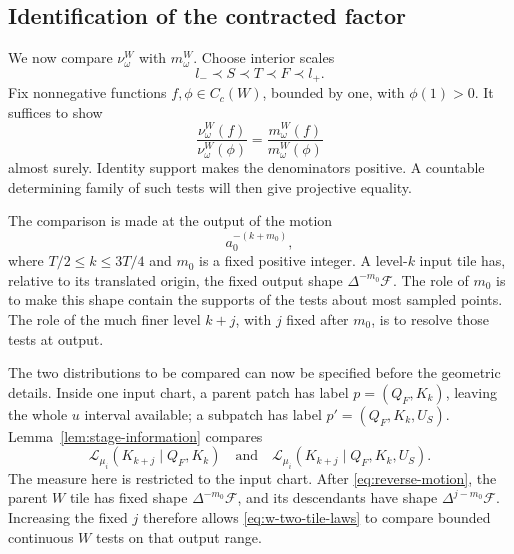 \subsection{Identification of the contracted factor}

We now compare \(\nu^W_\omega\) with \(m^W_\omega\).  Choose
interior scales
\begin{equation}\label{eq:w-factor-scales}
                       l_-\prec S\prec T\prec F\prec l_+.
\end{equation}
Fix nonnegative functions \(f,\phi\in C_c(W)\), bounded by one,
with \(\phi(1)>0\).  It suffices to show
\begin{equation}\label{eq:w-ratio-target}
        \frac{\nu^W_\omega(f)}{\nu^W_\omega(\phi)}
                  =
        \frac{m^W_\omega(f)}{m^W_\omega(\phi)}
\end{equation}
almost surely.  Identity support makes the denominators positive.
A countable determining family of such tests will then give
projective equality.

The comparison is made at the output of the motion
\begin{equation}\label{eq:reverse-motion}
                         a_0^{-(k+m_0)},
\end{equation}
where \(T/2\le k\le3T/4\) and \(m_0\) is a fixed positive integer.
A level-\(k\) input tile has, relative to its translated origin,
the fixed output shape \(\Delta^{-m_0}\mathcal F\).
The role of \(m_0\) is to make this shape contain the supports of
the tests about most sampled points.  The role of the much finer
level \(k+j\), with \(j\) fixed after \(m_0\), is to resolve those
tests at output.

The two distributions to be compared can now be specified before
the geometric details.  Inside one input chart, a parent patch has
label \(p=(Q_F,K_k)\), leaving the whole \(u\) interval available;
a subpatch has label \(p'=(Q_F,K_k,U_S)\).
Lemma~\ref{lem:stage-information} compares
\begin{equation}\label{eq:w-two-tile-laws}
 \mathcal L_{\mu_i}(K_{k+j}\mid Q_F,K_k)
 \quad\text{and}\quad
 \mathcal L_{\mu_i}(K_{k+j}\mid Q_F,K_k,U_S).
\end{equation}
The measure here is restricted to the input chart.
After \eqref{eq:reverse-motion}, the parent \(W\) tile has fixed
shape \(\Delta^{-m_0}\mathcal F\), and its descendants have shape
\(\Delta^{j-m_0}\mathcal F\).  Increasing the fixed \(j\) therefore
allows \eqref{eq:w-two-tile-laws} to compare bounded continuous
\(W\) tests on that output range.

